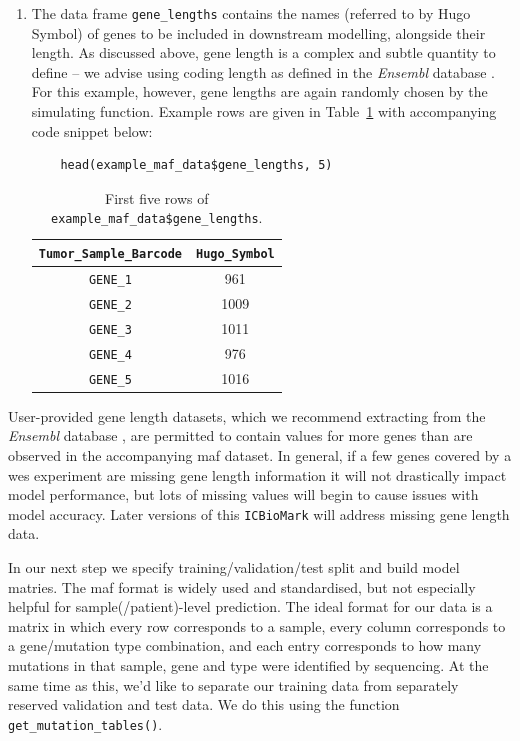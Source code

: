 \documentclass[../thesis.tex]{subfiles}
\begin{document}
\begin{enumerate}
    \item The data frame \lstinline{gene_lengths} contains the names (referred to by Hugo Symbol) of genes to be included in downstream modelling, alongside their length. As discussed above, gene length is a complex and subtle quantity to define -- we advise using coding length as defined in the \emph{Ensembl} database \citep{yates_ensembl_2020}. For this example, however, gene lengths are again randomly chosen by the simulating function. Example rows are given in Table~\ref{tab:example_gene_lengths} with accompanying code snippet below: 
\begin{lstlisting}
    head(example_maf_data$gene_lengths, 5)
\end{lstlisting}
\begin{table}[ht]
    \centering
    \begin{tabular}{c|c}
         \verb|Tumor_Sample_Barcode| & \verb|Hugo_Symbol| \\
         \hline
\verb|GENE_1| &	961	\\
\verb|GENE_2| &	1009  \\
\verb|GENE_3| &	1011  \\
\verb|GENE_4| &	976 \\
\verb|GENE_5| &	1016\\
    \end{tabular}
    \caption{First five rows of \lstinline{example_maf_data$gene_lengths}.}
    \label{tab:example_gene_lengths}
\end{table}
\end{enumerate}
 User-provided gene length datasets, which we recommend extracting from the \emph{Ensembl} database \citep{yates_ensembl_2020}, are permitted to contain values for more genes than are observed in the accompanying \gls{maf} dataset. In general, if a few genes covered by a \gls{wes} experiment are missing gene length information it will not drastically impact model performance, but lots of missing values will begin to cause issues with model accuracy. Later versions of this \texttt{ICBioMark} will address missing gene length data.

In our next step we specify training/validation/test split and build model matries. The \gls{maf} format is widely used and standardised, but not especially helpful for sample(/patient)-level prediction. The ideal format for our data is a matrix in which every row corresponds to a sample, every column corresponds to a gene/mutation type combination, and each entry corresponds to how many mutations in that sample, gene and type were identified by sequencing. At the same time as this, we’d like to separate our training data from separately reserved validation and test data. We do this using the function \lstinline{get_mutation_tables()}.
\end{document}
